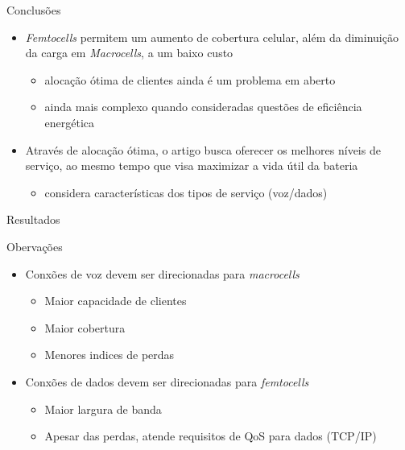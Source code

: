 \begin{frame}{Conclusões}
  \begin{block}{}
    \begin{itemize}
      \item \textit{Femtocells} permitem um \alert{aumento de cobertura}
      celular, além da \alert{diminuição} da carga em \textit{Macrocells}, a um
      \alert{baixo custo}
      \begin{itemize}
        \item alocação ótima de clientes ainda é um problema em aberto
        \item ainda mais complexo quando consideradas questões de eficiência
        energética
      \end{itemize}
    \end{itemize}
  \end{block}
  \pause
  \begin{block}{}
    \begin{itemize}
      \item Através de alocação ótima, o artigo busca oferecer os
      \alert{melhores níveis de serviço}, ao mesmo tempo que visa
      \alert{maximizar a vida útil da bateria}
      \begin{itemize}
        \item considera características dos tipos de serviço (voz/dados)
      \end{itemize}
    \end{itemize}
  \end{block}
\end{frame}

\begin{frame}{Resultados}
  \begin{block}{Obervações}
    \begin{itemize}
      \item Conxões de \alert{voz} devem ser direcionadas para
      \alert{\textit{macrocells}}
      \begin{itemize}
        \item Maior capacidade de clientes
        \item Maior cobertura
        \item Menores indices de perdas
      \end{itemize}
      \item Conxões de \alert{dados} devem ser direcionadas para
      \alert{\textit{femtocells}}
      \begin{itemize}
        \item Maior largura de banda
        \item Apesar das perdas, atende requisitos de QoS para dados (TCP/IP)
      \end{itemize}
    \end{itemize}
  \end{block}
\end{frame}

